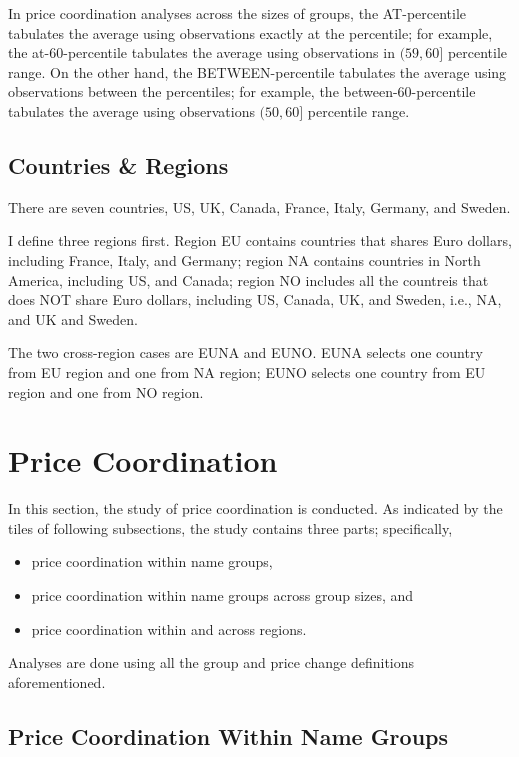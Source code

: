 In price coordination analyses across the sizes of groups, the AT-percentile tabulates the average using observations exactly at the percentile; for example, the at-60-percentile tabulates the average using observations in $ (59,60] $ percentile range. On the other hand, the BETWEEN-percentile tabulates the average using observations between the percentiles; for example, the between-60-percentile tabulates the average using observations $ (50,60] $ percentile range.

\subsection{Countries \& Regions}

There are seven countries, US, UK, Canada, France, Italy, Germany, and Sweden.

I define three regions first. Region EU contains countries that shares Euro dollars, including France, Italy, and Germany; region NA contains countries in North America, including US, and Canada; region NO includes all the countreis that does NOT share Euro dollars, including US, Canada, UK, and Sweden, i.e., NA, and UK and Sweden.

The two cross-region cases are EUNA and EUNO. EUNA selects one country from EU region and one from NA region; EUNO selects one country from EU region and one from NO region.

\clearpage
\section{Price Coordination}

In this section, the study of price coordination is conducted. As indicated by the tiles of following subsections, the study contains three parts; specifically,
\begin{itemize}
	\item price coordination within name groups,
	\item price coordination within name groups across group sizes, and
	\item price coordination within and across regions.
\end{itemize}
Analyses are done using all the group and price change definitions aforementioned.

\subsection{Price Coordination Within Name Groups}

